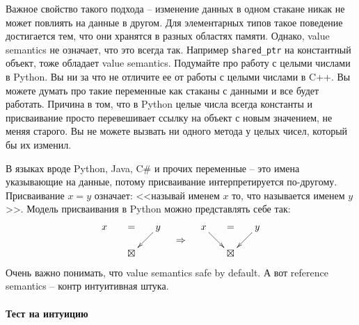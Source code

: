 Важное свойство такого подхода -- изменение данных в одном стакане никак не может повлиять на данные в другом.
Для элементарных типов такое поведение достигается тем, что они хранятся в разных областях памяти.
Однако, value semantics не означает, что это всегда так.
Например \verb"shared_ptr" на константный объект, тоже обладает value semantics.
Подумайте про работу с целыми числами в Python.
Вы ни за что не отличите ее от работы с целыми числами в C++.
Вы можете думать про такие переменные как стаканы с данными и все будет работать.
Причина в том, что в Python целые числа всегда константы и присваивание просто перевешивает ссылку на объект с новым значением, не меняя старого.
Вы не можете вызвать ни одного метода у целых чисел, который бы их изменил.


В языках вроде Python, Java, C\# и прочих переменные -- это имена указывающие на данные, потому присваивание интерпретируется по-другому.
Присваивание $x = y$ означает: <<называй именем $x$ то, что называется именем $y$>>.
Модель присваивания в Python можно представлять себе так: 
\[
\begin{aligned}
\xymatrix@R=15pt@C=15pt{
{x}&{=}&{y}\ar[dl]\\
{}&{\boxtimes}&{}
}
\end{aligned}
\quad\Rightarrow\quad
\begin{aligned}
\xymatrix@R=15pt@C=15pt{
{x}\ar[dr]&{=}&{y}\ar[dl]\\
{}&{\boxtimes}&{}
}
\end{aligned}
\]
Очень важно понимать, что value semantics safe by default.
А вот reference semantics -- контр интуитивная штука.

\paragraph{Тест на интуицию}

